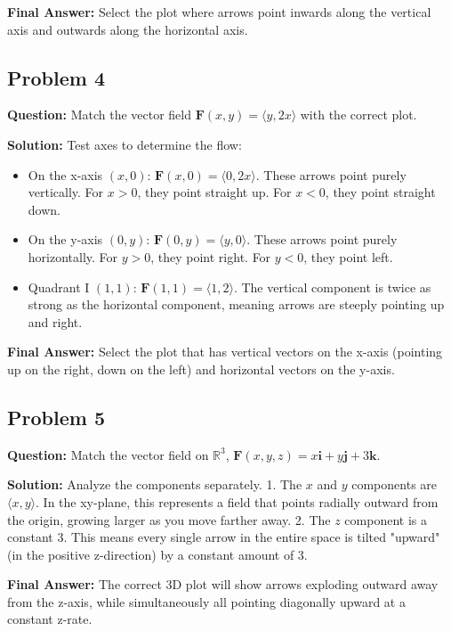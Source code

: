 \documentclass[11pt]{article}
\begin{document}
\textbf{Final Answer:} Select the plot where arrows point inwards along the vertical axis and outwards along the horizontal axis.

\subsection*{Problem 4}
\textbf{Question:} Match the vector field $\mathbf{F}(x, y) = \langle y, 2x \rangle$ with the correct plot.

\textbf{Solution:}
Test axes to determine the flow:
\begin{itemize}
    \item On the x-axis $(x, 0)$: $\mathbf{F}(x, 0) = \langle 0, 2x \rangle$. These arrows point purely vertically. For $x > 0$, they point straight up. For $x < 0$, they point straight down.
    \item On the y-axis $(0, y)$: $\mathbf{F}(0, y) = \langle y, 0 \rangle$. These arrows point purely horizontally. For $y > 0$, they point right. For $y < 0$, they point left.
    \item Quadrant I $(1, 1)$: $\mathbf{F}(1, 1) = \langle 1, 2 \rangle$. The vertical component is twice as strong as the horizontal component, meaning arrows are steeply pointing up and right.
\end{itemize}

\textbf{Final Answer:} Select the plot that has vertical vectors on the x-axis (pointing up on the right, down on the left) and horizontal vectors on the y-axis.

\subsection*{Problem 5}
\textbf{Question:} Match the vector field on $\mathbb{R}^3$, $\mathbf{F}(x, y, z) = x\mathbf{i} + y\mathbf{j} + 3\mathbf{k}$.

\textbf{Solution:}
Analyze the components separately.
1. The $x$ and $y$ components are $\langle x, y \rangle$. In the xy-plane, this represents a field that points radially outward from the origin, growing larger as you move farther away.
2. The $z$ component is a constant $3$. This means every single arrow in the entire space is tilted "upward" (in the positive z-direction) by a constant amount of 3.

\textbf{Final Answer:} The correct 3D plot will show arrows exploding outward away from the z-axis, while simultaneously all pointing diagonally upward at a constant z-rate.
\end{document}
